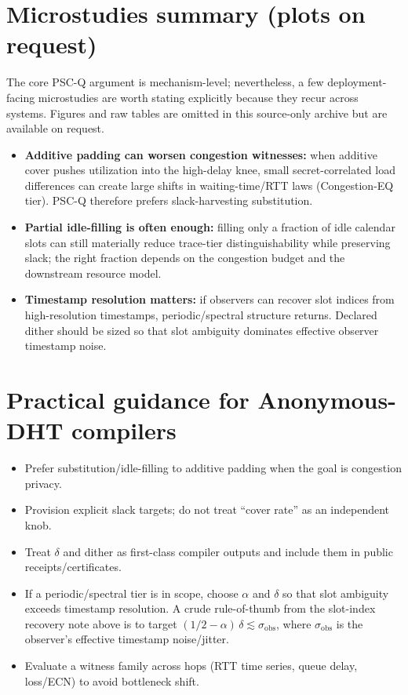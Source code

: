 \documentclass[11pt]{article}
\theoremstyle{definition}
\theoremstyle{remark}
\begin{document}
\section{Microstudies summary (plots on request)}
\label{sec:microstudies-summary}
The core PSC-Q argument is mechanism-level; nevertheless, a few deployment-facing microstudies are worth stating explicitly because they recur across systems.
Figures and raw tables are omitted in this source-only archive but are available on request.
\begin{itemize}[leftmargin=*]
\item \textbf{Additive padding can worsen congestion witnesses:} when additive cover pushes utilization into the high-delay knee, small secret-correlated load differences can create large shifts in waiting-time/RTT laws (Congestion-EQ tier). PSC-Q therefore prefers slack-harvesting substitution.
\item \textbf{Partial idle-filling is often enough:} filling only a fraction of idle calendar slots can still materially reduce trace-tier distinguishability while preserving slack; the right fraction depends on the congestion budget and the downstream resource model.
\item \textbf{Timestamp resolution matters:} if observers can recover slot indices from high-resolution timestamps, periodic/spectral structure returns. Declared dither should be sized so that slot ambiguity dominates effective observer timestamp noise.
\end{itemize}

\section{Practical guidance for Anonymous-DHT compilers}
\begin{itemize}[leftmargin=1.2em]
\item Prefer substitution/idle-filling to additive padding when the goal is congestion privacy.
\item Provision explicit slack targets; do not treat ``cover rate'' as an independent knob.
\item Treat $\delta$ and dither as first-class compiler outputs and include them in public receipts/certificates.
\item If a periodic/spectral tier is in scope, choose \(\alpha\) and \(\delta\) so that slot ambiguity exceeds timestamp resolution.
  A crude rule-of-thumb from the slot-index recovery note above is to target \((1/2-\alpha)\,\delta \lesssim \sigma_{\mathrm{obs}}\), where \(\sigma_{\mathrm{obs}}\) is the observer's effective timestamp noise/jitter.
\item Evaluate a witness family across hops (RTT time series, queue delay, loss/ECN) to avoid bottleneck shift.
\end{itemize}
\end{document}
